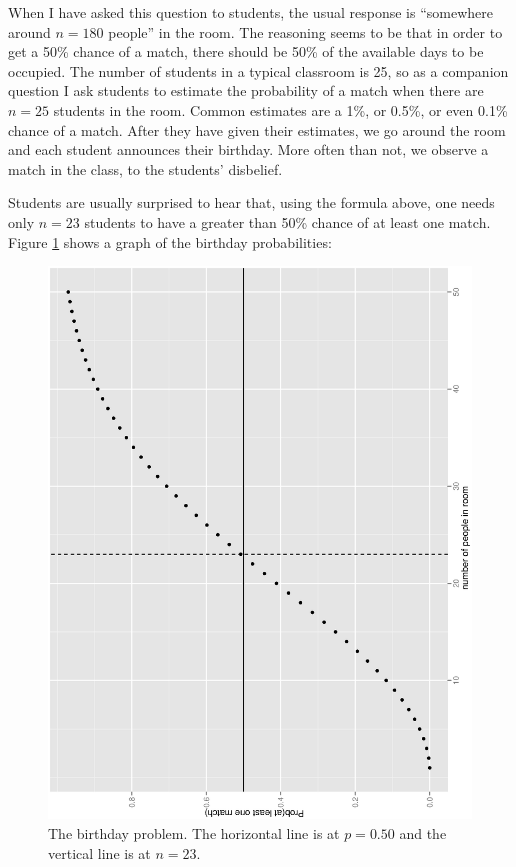 \documentclass[captions=tableheading]{scrbook}
\begin{document}
\begin{example}
When I have asked this question to students, the usual response is ``somewhere around \(n=180\) people'' in the room. The reasoning seems to be that in order to get a 50\% chance of a match, there should be 50\% of the available days to be occupied. The number of students in a typical classroom is 25, so as a companion question I ask students to estimate the probability of a match when there are \(n=25\) students in the room. Common estimates are a 1\%, or 0.5\%, or even 0.1\% chance of a match. After they have given their estimates, we go around the room and each student announces their birthday. More often than not, we observe a match in the class, to the students' disbelief.

Students are usually surprised to hear that, using the formula above, one needs only \(n=23\) students to have a greater than 50\% chance of at least one match. Figure \ref{fig:birthday} shows a graph of the birthday probabilities:
\end{example}







\begin{figure}[th]
  \includegraphics[angle=270, totalheight=4in]{ps/birthday.ps}
  \caption[The birthday problem]{The birthday problem. {\small The horizontal line is at \(p=0.50\) and the vertical line is at \(n=23\).}}
  \label{fig:birthday}
\end{figure}
\end{document}
